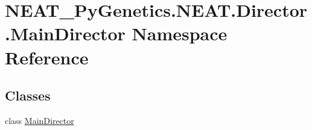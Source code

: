\hypertarget{namespaceNEAT__PyGenetics_1_1NEAT_1_1Director_1_1MainDirector}{}\section{N\+E\+A\+T\+\_\+\+Py\+Genetics.\+N\+E\+A\+T.\+Director.\+Main\+Director Namespace Reference}
\label{namespaceNEAT__PyGenetics_1_1NEAT_1_1Director_1_1MainDirector}
\subsection*{Classes}
\begin{DoxyCompactItemize}
\item 
class \hyperlink{classNEAT__PyGenetics_1_1NEAT_1_1Director_1_1MainDirector_1_1MainDirector}{Main\+Director}
\end{DoxyCompactItemize}
